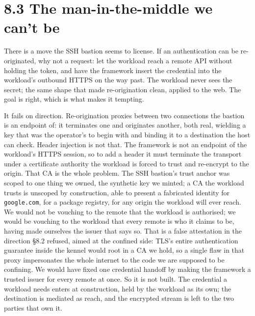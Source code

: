 \hypertarget{the-man-in-the-middle-we-cant-be}{%
\section{8.3 The man-in-the-middle we can't
be}\label{the-man-in-the-middle-we-cant-be}}

There is a move the SSH bastion seems to license. If an authentication
can be re-originated, why not a request: let the workload reach a remote
API without holding the token, and have the framework insert the
credential into the workload's outbound HTTPS on the way past. The
workload never sees the secret; the same shape that made re-origination
clean, applied to the web. The goal is right, which is what makes it
tempting.

It fails on direction. Re-origination proxies between two connections
the bastion is an endpoint of: it terminates one and originates another,
both real, wielding a key that was the operator's to begin with and
binding it to a destination the host can check. Header injection is not
that. The framework is not an endpoint of the workload's HTTPS session,
so to add a header it must terminate the transport under a certificate
authority the workload is forced to trust and re-encrypt to the origin.
That CA is the whole problem. The SSH bastion's trust anchor was scoped
to one thing we owned, the synthetic key we minted; a CA the workload
trusts is unscoped by construction, able to present a fabricated
identity for \texttt{google.com}, for a package registry, for any origin
the workload will ever reach. We would not be vouching to the remote
that the workload is authorised; we would be vouching to the workload
that every remote is who it claims to be, having made ourselves the
issuer that says so. That is a false attestation in the direction §8.2
refused, aimed at the confined side: TLS's entire authentication
guarantee inside the kennel would root in a CA we hold, so a single flaw
in that proxy impersonates the whole internet to the code we are
supposed to be confining. We would have fixed one credential handoff by
making the framework a trusted issuer for every remote at once. So it is
not built. The credential a workload needs enters at construction, held
by the workload as its own; the destination is mediated as reach, and
the encrypted stream is left to the two parties that own it.
